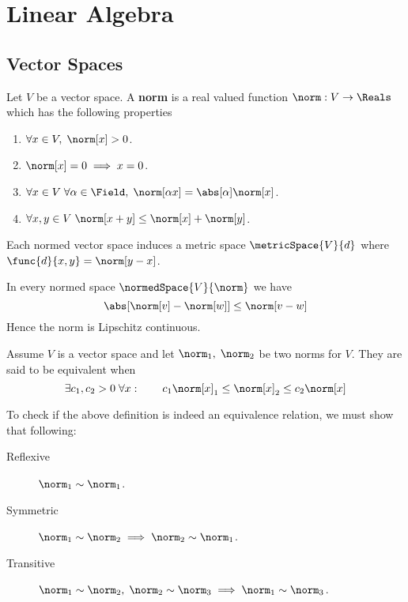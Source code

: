 \section{Linear Algebra}
\subsection{Vector Spaces}

\begin{definition}
    Let \(V\) be a vector space. A \textbf{norm} is a real valued function \(\norm: V \to \Reals\) which has the following properties
    \begin{enumerate}
        \item \(\forall x \in V, \; \norm[x] > 0\).
        \item \(\norm[x] = 0 \implies x = 0\).
        \item \(\forall x \in V \; \forall \alpha \in \Field, \; \norm[\alpha x] = \abs[\alpha] \norm[x]\).
        \item \(\forall x,y \in V \; \norm[x+y] \leq \norm[x] + \norm[y]\).
    \end{enumerate}
\end{definition}

Each normed vector space induces a metric space \(\metricSpace{V}{d}\) where \(\func{d}{x,y} = \norm[y - x]\).

\begin{theorem}
    In every normed space \(\normedSpace{V}{\norm}\) we have
    \begin{equation*}
        \abs[ {\norm[v] - \norm[w]}] \leq \norm[v - w]
    \end{equation*}
    Hence the norm is Lipschitz continuous.
\end{theorem}


\begin{definition}
    Assume \(V\) is a vector space and let \(\norm_1, \; \norm_2\) be two norms for \(V\). They are said to be equivalent when
    \begin{equation*}
        \exists c_1,c_2 > 0 \; \forall x : \qquad c_1 \norm[x]_1 \leq \norm[x]_2 \leq c_2 \norm[x]
    \end{equation*}
\end{definition}

To check if the above definition is indeed an equivalence relation, we must show that following:
\begin{description}
    \item [Reflexive] \(\norm_1 \sim \norm_1\).
    \item [Symmetric] \(\norm_1 \sim \norm_2 \implies \norm_2 \sim \norm_1\).
    \item [Transitive] \( \norm_1 \sim \norm_2 , \; \norm_2 \sim \norm_3 \implies \norm_1 \sim \norm_3\).
\end{description}

